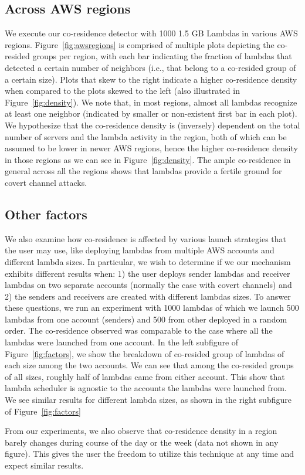 \subsection{Across AWS regions}
We execute our co-residence detector with 1000 1.5 GB Lambdas in various AWS
regions. Figure~\ref{fig:awsregions} is comprised of multiple plots depicting
the co-resided groups per region, with each bar indicating the fraction of
lambdas that detected a certain number of neighbors (i.e., that belong to a
co-resided group of a certain size). Plots that skew to the right indicate a
higher co-residence density when compared to the plots skewed to the left (also
illustrated in Figure~\ref{fig:density}). We note that, in most regions, almost
all lambdas recognize at least one neighbor (indicated by smaller or
non-existent first bar in each plot). We hypothesize that the co-residence
density is (inversely) dependent on the total number of servers and the lambda
activity in the region, both of which can be assumed to be lower in newer AWS
regions, hence the higher co-residence density in those regions as we can see in
Figure~\ref{fig:density}. The ample co-residence in general across all the
regions shows that lambdas provide a fertile ground for covert channel attacks.


\subsection{Other factors}
We also examine how co-residence is affected by various launch strategies that
the user may use, like deploying lambdas from multiple AWS accounts and
different lambda sizes. In particular, we wish to determine if we our mechanism
exhibits different results when: 1) the user deploys sender lambdas and receiver
lambdas on two separate accounts (normally the case with covert channels) and 2)
the senders and receivers are created with different lambdas sizes.  To answer
these questions, we run an experiment with 1000 lambdas of which we launch 500
lambdas from one account (senders) and 500 from other deployed in a random
order. The co-residence observed was comparable to the case where all the
lambdas were launched from one account. In the left subfigure of
Figure~\ref{fig:factors}, we show the breakdown of co-resided group of lambdas
of each size among the two accounts.  We can see that among the co-resided
groups of all sizes, roughly half of lambdas came from either account. This show
that lambda scheduler is agnostic to the accounts the lambdas were launched
from. We see similar results for different lambda sizes, as shown in the right
subfigure of Figure~\ref{fig:factors}

From our experiments, we also observe that co-residence density in a region
barely changes during course of the day or the week (data not shown
in any figure).  This gives the user the freedom to utilize this
technique at any time and expect similar results.
